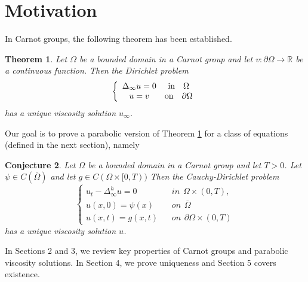 \documentclass[12pt]{amsart}
\newtheorem{thm}{Theorem}[section]
\newtheorem{conj}[thm]{Conjecture}
\theoremstyle{definition}
\theoremstyle{remark}
\numberwithin{equation}{section}
\begin{document}
\section{Motivation}
In Carnot groups, the following theorem has been established. 
\begin{thm}\cite{B:HG, W:W, B:MP} \label{subelliptic}
    Let $\Omega$ be a bounded domain in a Carnot group and let 
    $v:\partial \Omega \to \mathbb{R}$ be a continuous 
    function.
    Then the Dirichlet problem 
    \begin{eqnarray*}
\left\{ \begin{array}{cc}
\Delta_{\infty}u  =  0  & \textmd{in\ \ \ } \Omega \\
u = v & \textmd{on\ \ \ } \partial \Omega
\end{array} \right.
\end{eqnarray*}
has a unique viscosity solution $u_\infty$. 
\end{thm}
Our goal is to prove a parabolic version of Theorem \ref{subelliptic} for a class of equations (defined in the next section), namely 
\begin{conj}
Let $\Omega$ be a bounded domain in a Carnot group and let $T>0$.  Let $\psi\in C(\overline{\Omega})$ and let $g \in C(\Omega \times [0,T))$ Then the Cauchy-Dirichlet problem
\begin{equation}\label{maincon}
\left\{ \begin{array}{cl}
u_t - \Delta^h_{\infty}u =0& \hspace{10pt} in \hspace{5pt} \Omega \times (0,T),\\ 
u(x,0) =\psi(x) & \hspace{10pt} on \hspace{5pt} \overline{\Omega} \\
u(x,t)=g(x,t) & \hspace{10pt} on \hspace{5pt} \partial \Omega \times (0,T)
\end{array}\right.
\end{equation}
has a unique viscosity solution $u$. 
\end{conj}

In Sections 2 and 3, we review key properties of Carnot groups and parabolic viscosity solutions. In Section 4, we prove uniqueness and Section 5 covers existence. 
\end{document}
